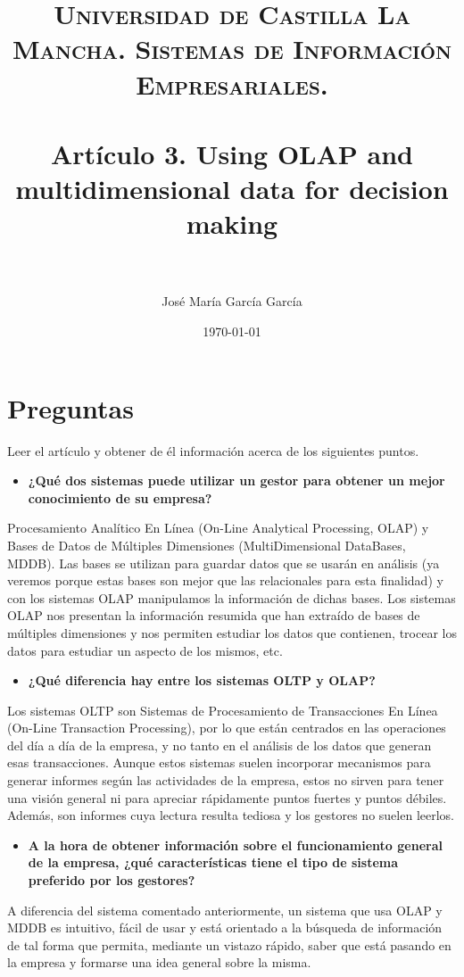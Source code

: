 \documentclass[paper=a4, fontsize=11pt]{scrartcl} %
\title{	
\normalfont \normalsize 
\textsc{Universidad de Castilla La Mancha. Sistemas de Información Empresariales.} \\ [25pt] %
\horrule{0.5pt} \\[0.4cm] %
\huge Artículo 3. Using OLAP and multidimensional data for decision making \\ %
\horrule{2pt} \\[0.5cm] %
}
\author{José María García García} %
\date{\normalsize\today} %
\begin{document}
\maketitle %


\section{Preguntas}

Leer el artículo y obtener de él información acerca de los siguientes puntos.

\begin{itemize}
\item \textbf{ ¿Qué dos sistemas puede utilizar un gestor para obtener un mejor conocimiento de su empresa?}
\end{itemize}
Procesamiento Analítico En Línea (On-Line Analytical Processing, OLAP) y Bases de Datos de Múltiples Dimensiones (MultiDimensional DataBases, MDDB). Las bases se utilizan para guardar datos que se usarán en análisis (ya veremos porque estas bases son mejor que las relacionales para esta finalidad) y con los sistemas OLAP manipulamos la información de dichas bases. Los sistemas OLAP nos presentan la información resumida que han extraído de bases de múltiples dimensiones y nos permiten estudiar los datos que contienen, trocear los datos para estudiar un aspecto de los mismos, etc. 

\begin{itemize}
\item \textbf{¿Qué diferencia hay entre los sistemas OLTP y OLAP?}
\end{itemize}
Los sistemas OLTP son Sistemas de Procesamiento de Transacciones En Línea (On-Line Transaction Processing), por lo que están centrados en las operaciones del día a día de la empresa, y no tanto en el análisis de los datos que generan esas transacciones. Aunque estos sistemas suelen incorporar mecanismos para generar informes según las actividades de la empresa, estos no sirven para tener una visión general ni para apreciar rápidamente puntos fuertes y puntos débiles. Además, son informes cuya lectura resulta tediosa y los gestores no suelen leerlos. 

\begin{itemize}
\item \textbf{A la hora de obtener información sobre el funcionamiento general de la empresa, ¿qué características tiene el tipo de sistema preferido por los gestores?}
\end{itemize}
A diferencia del sistema comentado anteriormente, un sistema que usa OLAP y MDDB es intuitivo, fácil de usar y está orientado a la búsqueda de información de tal forma que permita, mediante un vistazo rápido, saber que está pasando en la empresa y formarse una idea general sobre la misma.
\end{document}
